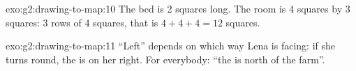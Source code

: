 \begin{solution}{exo:g2:drawing-to-map:10}
The bed is 2 squares long. The room is 4 squares by 3 squares: 3 rows of 4
squares, that is $4 + 4 + 4 = 12$ squares.
\end{solution}

\begin{solution}{exo:g2:drawing-to-map:11}
``Left'' depends on which way Lena is facing: if she turns round, the 
is on her right. For everybody: ``the  is north of the farm''.
\end{solution}
